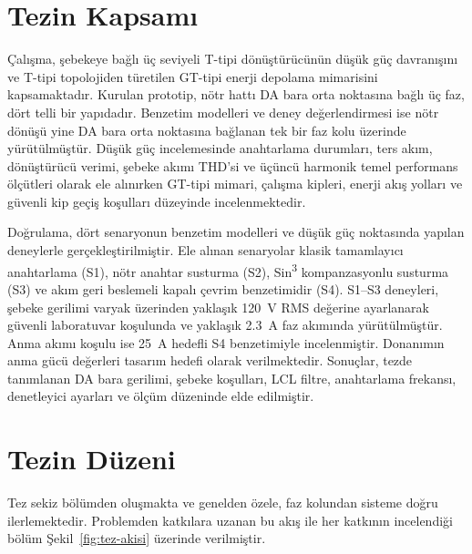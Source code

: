 \section{Tezin Kapsamı}
\label{sec:giris-kapsam}

Çalışma, şebekeye bağlı üç seviyeli T-tipi dönüştürücünün düşük güç davranışını ve T-tipi topolojiden türetilen GT-tipi enerji depolama mimarisini kapsamaktadır. Kurulan prototip, nötr hattı DA bara orta noktasına bağlı üç faz, dört telli bir yapıdadır. Benzetim modelleri ve deney değerlendirmesi ise nötr dönüşü yine DA bara orta noktasına bağlanan tek bir faz kolu üzerinde yürütülmüştür. Düşük güç incelemesinde anahtarlama durumları, ters akım, dönüştürücü verimi, şebeke akımı THD'si ve üçüncü harmonik temel performans ölçütleri olarak ele alınırken GT-tipi mimari, çalışma kipleri, enerji akış yolları ve güvenli kip geçiş koşulları düzeyinde incelenmektedir.

Doğrulama, dört senaryonun benzetim modelleri ve düşük güç noktasında yapılan deneylerle gerçekleştirilmiştir. Ele alınan senaryolar klasik tamamlayıcı anahtarlama (S1), nötr anahtar susturma (S2), Sin\textsuperscript{3} kompanzasyonlu susturma (S3) ve akım geri beslemeli kapalı çevrim benzetimidir (S4). S1--S3 deneyleri, şebeke gerilimi varyak üzerinden yaklaşık \SI{120}{\volt} RMS değerine ayarlanarak güvenli laboratuvar koşulunda ve yaklaşık \SI{2.3}{\ampere} faz akımında yürütülmüştür. Anma akımı koşulu ise \SI{25}{\ampere} hedefli S4 benzetimiyle incelenmiştir. Donanımın anma gücü değerleri tasarım hedefi olarak verilmektedir. Sonuçlar, tezde tanımlanan DA bara gerilimi, şebeke koşulları, LCL filtre, anahtarlama frekansı, denetleyici ayarları ve ölçüm düzeninde elde edilmiştir.

\section{Tezin Düzeni}
\label{sec:giris-duzen}

Tez sekiz bölümden oluşmakta ve genelden özele, faz kolundan sisteme doğru ilerlemektedir. Problemden katkılara uzanan bu akış ile her katkının incelendiği bölüm Şekil~\ref{fig:tez-akisi} üzerinde verilmiştir.

